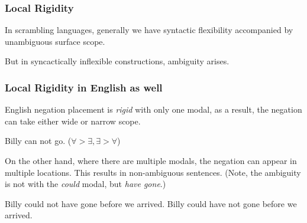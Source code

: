 \documentclass{beamer}
\begin{document}
\begin{frame}
	\frametitle{Local Rigidity}\pause
	In scrambling languages, generally we have syntactic flexibility accompanied by unambiguous surface scope.\pause
	
\begin{exe}
\ex \begin{xlist}\label{chin}
\end{xlist}
\end{exe}\pause

But in syncactically inflexible constructions, ambiguity arises.\pause

\begin{exe}
\end{exe}
\end{frame}

\begin{frame}
	\frametitle{Local Rigidity in English as well}\pause

	English negation placement is \emph{rigid} with only one modal, as a result, the negation can take either wide or narrow scope.\pause

	\begin{exe}
		\ex Billy can not go. (${\forall}>{\exists}, {\exists}>{\forall}$)\pause
	\end{exe}

	On the other hand, where there are multiple modals, the negation can appear in multiple locations. This results in non-ambiguous sentences. (Note, the ambiguity is not with the \emph{could} modal, but \emph{have gone}.)\pause

	\begin{exe}
		\ex Billy could not have gone before we arrived.\label{could not}\pause
		\ex Billy could have not gone before we arrived.\label{have not}
	\end{exe}

\end{frame}
\end{document}
